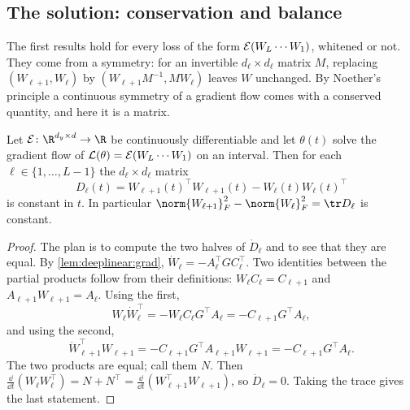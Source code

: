 \begin{refsection}
\section{The solution: conservation and balance}\label{sec:deeplinear:balance}

The first results hold for every loss of the form $\mathcal{E}(W_L\cdots W_1)$, whitened or not. They come from a symmetry: for an invertible $d_\ell\times d_\ell$ matrix $M$, replacing $(W_{\ell+1},W_\ell)$ by $(W_{\ell+1}M^{-1},MW_\ell)$ leaves $W$ unchanged. By Noether's principle a continuous symmetry of a gradient flow comes with a conserved quantity, and here it is a matrix.

\begin{theorem}\label{thm:deeplinear:conservation}
Let $\dlE\colon\R^{d_y\times d}\to\R$ be continuously differentiable and let $\theta(t)$ solve the gradient flow of $\mathcal{L}(\theta)=\mathcal{E}(W_L\cdots W_1)$ on an interval. Then for each $\ell\in\{1,\dots,L-1\}$ the $d_\ell\times d_\ell$ matrix
\[
  D_\ell(t)=W_{\ell+1}(t)^\top W_{\ell+1}(t)-W_\ell(t)W_\ell(t)^\top
\]
is constant in $t$. In particular $\norm{W_{\ell+1}}_F^2-\norm{W_\ell}_F^2=\tr D_\ell$ is constant.
\end{theorem}

\begin{proof}
The plan is to compute the two halves of $\dot D_\ell$ and to see that they are equal. By \cref{lem:deeplinear:grad}, $\dot W_\ell=-A_\ell^\top GC_\ell^\top$. Two identities between the partial products follow from their definitions: $W_\ell C_\ell=C_{\ell+1}$ and $A_{\ell+1}W_{\ell+1}=A_\ell$. Using the first,
\[
  W_\ell\dot W_\ell^\top=-W_\ell C_\ell G^\top A_\ell=-C_{\ell+1}G^\top A_\ell ,
\]
and using the second,
\[
  \dot W_{\ell+1}^\top W_{\ell+1}=-C_{\ell+1}G^\top A_{\ell+1}W_{\ell+1}=-C_{\ell+1}G^\top A_\ell .
\]
The two products are equal; call them $N$. Then $\frac{\dd}{\dd t}(W_\ell W_\ell^\top)=N+N^\top=\frac{\dd}{\dd t}(W_{\ell+1}^\top W_{\ell+1})$, so $\dot D_\ell=0$. Taking the trace gives the last statement.
\end{proof}


\end{refsection}
